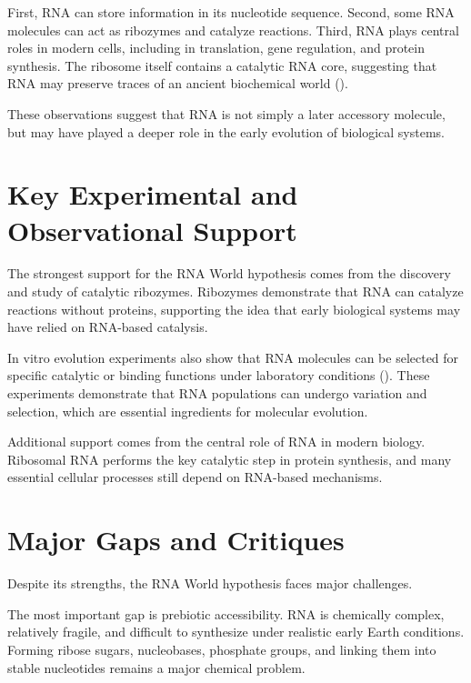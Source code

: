 \documentclass[
  oneside]{book}
\begin{document}
First, RNA can store information in its nucleotide sequence. Second, some RNA molecules can act as ribozymes and catalyze reactions. Third, RNA plays central roles in modern cells, including in translation, gene regulation, and protein synthesis. The ribosome itself contains a catalytic RNA core, suggesting that RNA may preserve traces of an ancient biochemical world ().

These observations suggest that RNA is not simply a later accessory molecule, but may have played a deeper role in the early evolution of biological systems.

\section{Key Experimental and Observational Support}\label{key-experimental-and-observational-support-1}

The strongest support for the RNA World hypothesis comes from the discovery and study of catalytic ribozymes. Ribozymes demonstrate that RNA can catalyze reactions without proteins, supporting the idea that early biological systems may have relied on RNA-based catalysis.

In vitro evolution experiments also show that RNA molecules can be selected for specific catalytic or binding functions under laboratory conditions (). These experiments demonstrate that RNA populations can undergo variation and selection, which are essential ingredients for molecular evolution.

Additional support comes from the central role of RNA in modern biology. Ribosomal RNA performs the key catalytic step in protein synthesis, and many essential cellular processes still depend on RNA-based mechanisms.

\section{Major Gaps and Critiques}\label{major-gaps-and-critiques-1}

Despite its strengths, the RNA World hypothesis faces major challenges.

The most important gap is prebiotic accessibility. RNA is chemically complex, relatively fragile, and difficult to synthesize under realistic early Earth conditions. Forming ribose sugars, nucleobases, phosphate groups, and linking them into stable nucleotides remains a major chemical problem.
\end{document}
